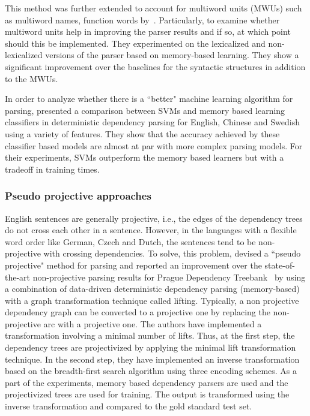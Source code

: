 This method was further extended to account for multiword units (MWUs) such as multiword names, function words by~\cite{nivre2004multiword}. Particularly, to examine whether multiword units help in improving the parser results and if so, at which point should this be implemented. They experimented on the lexicalized and non-lexicalized versions of the parser based on memory-based learning. They show a significant improvement over the baselines for the syntactic structures in addition to the MWUs.

In order to analyze whether there is a ``better" machine learning algorithm for parsing, \cite{Hall:2006:DCD:1273073.1273114} presented a comparison between SVMs and memory based learning classifiers in deterministic dependency parsing for English, Chinese and Swedish using a variety of features. They show that the accuracy achieved by these classifier based models are almost at par with more complex parsing models. For their experiments, SVMs outperform the memory based learners but with a tradeoff in training times.

\subsubsection{Pseudo projective approaches}

English sentences are generally projective, i.e., the edges of the dependency trees do not cross each other in a sentence. However, in the languages with a flexible word order like German, Czech and Dutch, the sentences tend to be non-projective with crossing dependencies. To solve, this problem, \cite{nivre2005pseudo} devised a ``pseudo projective" method for parsing and reported an improvement over the state-of-the-art non-projective parsing results for Prague Dependency Treebank~\citep{bohmova2003prague,hajic1998building} by using a combination of data-driven deterministic dependency parsing (memory-based) with a graph transformation technique called lifting. Typically, a non projective dependency graph can be converted to a projective one by replacing the non-projective arc with a projective one. The authors have implemented a transformation involving a minimal number of lifts. Thus, at the first step, the dependency trees are projectivized by applying the minimal lift transformation technique. In the second step, they have implemented an inverse transformation based on the breadth-first search algorithm using three encoding schemes. As a part of the experiments, memory based dependency parsers are used and the projectivized trees are used for training. The output is transformed using the inverse transformation and compared to the gold standard test set.

